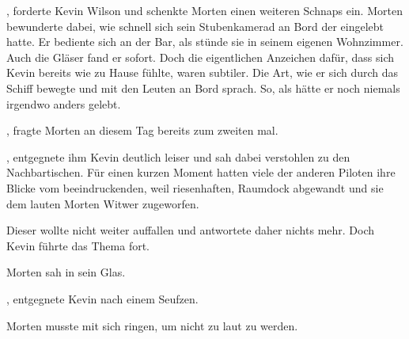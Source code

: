 , forderte Kevin Wilson und schenkte Morten einen weiteren Schnaps ein. Morten bewunderte dabei, wie schnell sich sein Stubenkamerad an Bord der  eingelebt hatte. Er bediente sich an der Bar, als stünde sie in seinem eigenen Wohnzimmer. Auch die Gläser fand er sofort. Doch die eigentlichen Anzeichen dafür, dass sich Kevin bereits wie zu Hause fühlte, waren subtiler. Die Art, wie er sich durch das Schiff bewegte und mit den Leuten an Bord sprach. So, als hätte er noch niemals irgendwo anders gelebt.

\par

, fragte Morten an diesem Tag bereits zum zweiten mal. 

\par

, entgegnete ihm Kevin deutlich leiser und sah dabei verstohlen zu den Nachbartischen. Für einen kurzen Moment hatten viele der anderen Piloten ihre Blicke vom beeindruckenden, weil riesenhaften, Raumdock abgewandt und sie dem lauten Morten Witwer zugeworfen.

\par

Dieser wollte nicht weiter auffallen und antwortete daher nichts mehr. Doch Kevin führte das Thema fort. 

\par

Morten sah in sein Glas. 

\par

, entgegnete Kevin nach einem Seufzen. 

\par

Morten musste mit sich ringen, um nicht zu laut zu werden. 

